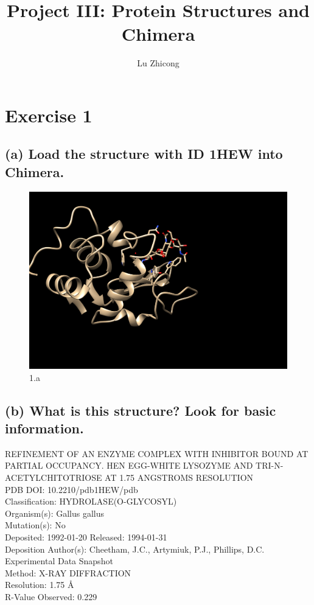 \documentclass[a4paper, 12pt, one column]{article}
\title{Project III: Protein Structures and Chimera}
\author{Lu Zhicong}
\begin{document}
\maketitle

\section{Exercise 1}
\subsection*{(a) Load the structure with ID 1HEW into Chimera.}
\begin{figure}[H]
    \centering
    \includegraphics[width=.8\linewidth]{1_a.png}
    \caption{1.a}
    \label{fig:1_a.png}
\end{figure}
\subsection*{(b) What is this structure? Look for basic information.}
REFINEMENT OF AN ENZYME COMPLEX WITH INHIBITOR BOUND AT PARTIAL OCCUPANCY. HEN EGG-WHITE LYSOZYME AND TRI-N-ACETYLCHITOTRIOSE AT 1.75 ANGSTROMS RESOLUTION\\
PDB DOI: 10.2210/pdb1HEW/pdb\\
Classification: HYDROLASE(O-GLYCOSYL)\\
Organism(s): Gallus gallus\\
Mutation(s): No \\
Deposited: 1992-01-20 Released: 1994-01-31 \\
Deposition Author(s): Cheetham, J.C., Artymiuk, P.J., Phillips, D.C.\\
Experimental Data Snapshot\\
Method: X-RAY DIFFRACTION\\
Resolution: 1.75 Å\\
R-Value Observed: 0.229 \\
\end{document}
